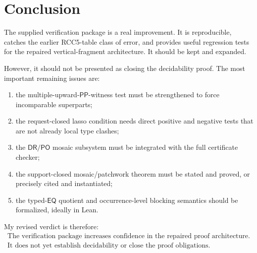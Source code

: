 \documentclass[11pt]{article}
\newcommand{\PP}{\mathsf{PP}}
\newcommand{\PO}{\mathsf{PO}}
\newcommand{\DR}{\mathsf{DR}}
\newcommand{\EQ}{\mathsf{EQ}}
\begin{document}
\section{Conclusion}

The supplied verification package is a real improvement.  It is reproducible, catches the earlier RCC5-table class of error, and provides useful regression tests for the repaired vertical-fragment architecture.  It should be kept and expanded.

However, it should not be presented as closing the decidability proof.  The most important remaining issues are:
\begin{enumerate}
\item the multiple-upward-\(\PP\)-witness test must be strengthened to force incomparable superparts;
\item the request-closed lasso condition needs direct positive and negative tests that are not already local type clashes;
\item the \(\DR/\PO\) mosaic subsystem must be integrated with the full certificate checker;
\item the support-closed mosaic/patchwork theorem must be stated and proved, or precisely cited and instantiated;
\item the typed-\(\EQ\) quotient and occurrence-level blocking semantics should be formalized, ideally in Lean.
\end{enumerate}

My revised verdict is therefore:
\[
\boxed{
\begin{gathered}
\text{The verification package increases confidence in the repaired proof architecture.}\\
\text{It does not yet establish decidability or close the proof obligations.}
\end{gathered}}
\]
\end{document}
